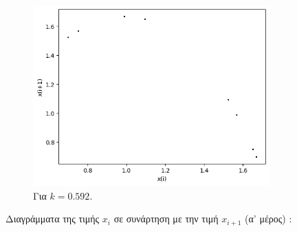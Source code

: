 \begin{figure}[h!]
\begin{subfigure}[b]{0.4\textwidth}
		\includegraphics[width=\textwidth]{LateX images/graphs q07/g7}
		\caption{Για $k=0.592$.}
		\label{f:k41}
	\end{subfigure}
	\hfill
	\caption{Διαγράμματα της τιμής \(x_i\) σε συνάρτηση με την τιμή \(x_{i+1}\) (α' μέρος) :}
\end{figure}
